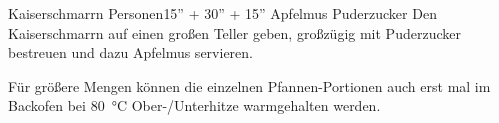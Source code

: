\begin{MyRecipe}{Kaiserschmarrn}{ Personen}{15'' + 30'' + 15''}
	\ingredient[\Calc{0.2}{\x}]{\si{\kilogram}} {Apfelmus}
	 {Puderzucker}
	Den Kaiserschmarrn auf einen großen Teller geben, großzügig mit Puderzucker bestreuen und dazu Apfelmus servieren.\par\bigskip
	
	Für größere Mengen können die einzelnen Pfannen-Portionen auch erst mal im Backofen bei \SI{80}{\degreeCelsius} Ober-/Unterhitze warmgehalten werden.

	
	

	
	
	
	
\end{MyRecipe}